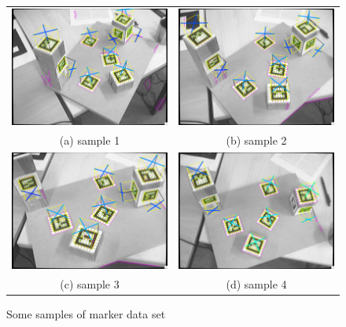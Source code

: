 \begin{figure}[H]  
\begin{tabular}{cc}
  \includegraphics[width=65mm]{figures/marker_frame_1} &  \includegraphics[width=65mm]{figures/marker_frame_2} \\
(a) sample 1 & (b) sample 2 \\[6pt]
  \includegraphics[width=65mm]{figures/marker_frame_3} &  \includegraphics[width=65mm]{figures/marker_frame_4} \\
(c) sample 3 & (d) sample 4 \\[6pt]
\end{tabular}
\caption{Some samples of marker data set}\label{fig:marker_ground_truth}
\end{figure}

